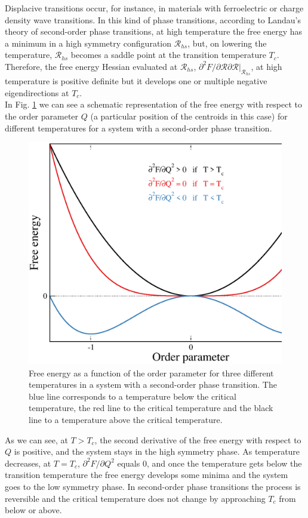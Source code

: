 Displacive transitions occur, for instance, in materials with ferroelectric or charge density wave transitions. In this kind of phase transitions, according to Landau's theory of second-order phase 
transitions\cite{lifshitz1980landau}, at high temperature the free energy has a minimum in a high symmetry configuration $\boldsymbol{\mathcal{R}}_{hs}$, but, on lowering the temperature, $\boldsymbol{\mathcal{R}}_{hs}$ 
becomes a saddle point at the transition temperature $T_{c}$. Therefore, the free energy Hessian evaluated at $\boldsymbol{\mathcal{R}}_{hs}$, $\partial^{2}F/\partial\boldsymbol{\mathcal{R\partial\boldsymbol{\mathcal{
R}}}}|_{\boldsymbol{\mathcal{R}}_{hs}}$, at high temperature is positive definite but it develops one or multiple negative eigendirections at $T_{c}$. \\

In Fig. \ref{transition} we can see a schematic representation of the free energy with respect to the order parameter $Q$ (a particular position of the centroids in this case) for different temperatures for a system with a 
second-order phase transition.
\begin{figure}[h]
\begin{center}
\includegraphics[width=0.8\linewidth]{Figures/data.eps}
\caption[Free energy as a function of temperature in a second-order phase transition]{Free energy as a function of the order parameter for three different temperatures in a system with a second-order phase transition. The 
blue line corresponds to a temperature below the critical temperature, the red line to the critical temperature and the black line to a temperature above the critical temperature.}
\label{transition}
\end{center}
\end{figure}
As we can see, at $T>T_{c}$, the second derivative of the free energy with respect to $Q$ is positive, and the system stays in the high symmetry phase. As temperature decreases, at $T=T_{c}$, $\partial^{2}F/\partial Q^{2}$ equals 
$0$, and once the temperature gets below the transition temperature the free energy develops some minima and the system goes to the low symmetry phase. In second-order phase transitions the process is reversible and the critical 
temperature does not change by approaching $T_{c}$ from below or above. \\

